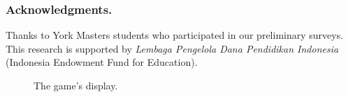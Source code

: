\documentclass[runningheads,a4paper]{llncs}
\begin{document}
\subsubsection*{Acknowledgments.} Thanks to York Masters students who participated in our preliminary surveys. This research is supported by \emph{Lembaga Pengelola Dana Pendidikan Indonesia} (Indonesia Endowment Fund for Education). 

\begin{figure}[htb]
\centering
{}
\caption{The game's display.}
\end{figure}

 

\end{document}
